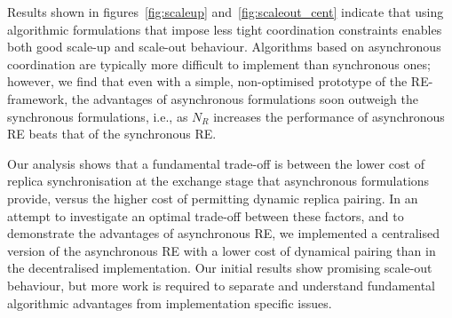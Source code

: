 \documentclass{rspublic}
\newcommand{\athotanote}[1]{ {\textcolor{green} { ***athota: #1 }}}
\newcommand{\athotanote}[1]{}
\begin{document}
Results shown in figures~\ref{fig:scaleup} and~\ref{fig:scaleout_cent}
indicate that using algorithmic formulations that impose less tight
coordination constraints enables both good scale-up and scale-out
behaviour.  Algorithms based on asynchronous coordination are
typically more difficult to implement than synchronous ones; however,
we find that even with a simple, non-optimised prototype of the
RE-framework, the advantages of asynchronous formulations soon outweigh the synchronous formulations, i.e., as $N_R$ increases the
performance of asynchronous RE beats that of the synchronous RE.  

Our analysis shows that a fundamental trade-off is between the lower
cost of replica synchronisation at the exchange stage that
asynchronous formulations provide, versus the higher cost of
permitting dynamic replica pairing.  In an attempt to investigate an
optimal trade-off between these factors, and to demonstrate the
advantages of asynchronous RE, we implemented a centralised version of
the asynchronous RE with a lower cost of dynamical pairing than in
the decentralised implementation. Our initial results show promising
scale-out behaviour, but more work is required to separate and
understand fundamental algorithmic advantages from implementation
specific issues.






\end{document}
